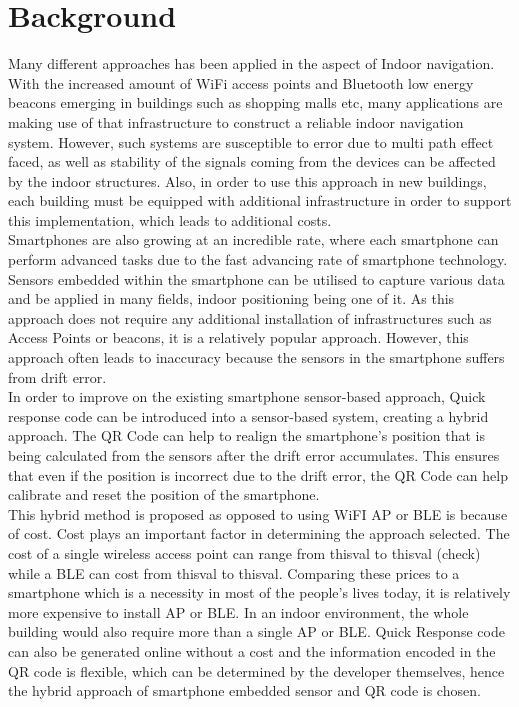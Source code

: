 \documentclass{l4proj}
\begin{document}
\chapter{Background}
Many different approaches has been applied in the aspect of Indoor navigation. With the increased amount of WiFi access points and Bluetooth low energy beacons emerging in buildings such as shopping malls etc, many applications are making use of that infrastructure to construct a reliable indoor navigation system. However, such systems are susceptible to error due to multi path effect faced, as well as stability of the signals coming from the devices can be affected by the indoor structures. Also, in order to use this approach in new buildings, each building must be equipped with additional infrastructure in order to support this implementation, which leads to additional costs.\\

Smartphones are also growing at an incredible rate, where each smartphone can perform advanced tasks due to the fast advancing rate of smartphone technology. Sensors embedded within the smartphone can be utilised to capture various data and be applied in many fields, indoor positioning being one of it. As this approach does not require any additional installation of infrastructures such as Access Points or beacons, it is a relatively popular approach. However, this approach often leads to inaccuracy because the sensors in the smartphone suffers from drift error.\\

In order to improve on the existing smartphone sensor-based approach, Quick response code can be introduced into a sensor-based system, creating a hybrid approach. The QR Code can help to realign the smartphone’s position that is being calculated from the sensors after the drift error accumulates. This ensures that even if the position is incorrect due to the drift error, the QR Code can help calibrate and reset the position of the smartphone.\\

This hybrid method is proposed as opposed to using WiFI AP or BLE is because of cost. Cost plays an important factor in determining the approach selected. The cost of a single wireless access point can range from thisval to thisval (check) while a BLE can cost from thisval to thisval. Comparing these prices to a smartphone which is a necessity in most of the people’s lives today, it is relatively more expensive to install AP or BLE. In an indoor environment, the whole building would also require more than a single AP or BLE. Quick Response code can also be generated online without a cost and the information encoded in the QR code is flexible, which can be determined by the developer themselves, hence the hybrid approach of smartphone embedded sensor and QR code is chosen.\\
\end{document}

